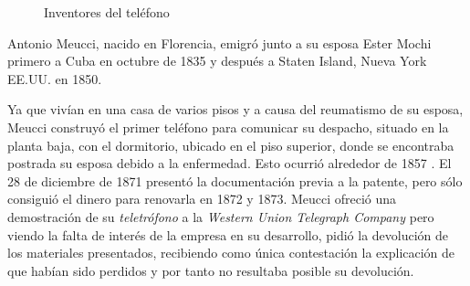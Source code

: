 \begin{figure}[h!btp]
	\begin{adjustbox}{minipage=\linewidth, fbox}
		\centering
		\hspace{10mm}
	\end{adjustbox}
\caption{Inventores del teléfono}
	\label{fig:telefono}
\end{figure}

Antonio Meucci, nacido en Florencia, emigró junto a su esposa Ester Mochi primero a Cuba en octubre de 1835 y después a Staten Island, Nueva York \ac{EE.UU.} en 1850.

Ya que vivían en una casa de varios pisos y a causa del reumatismo de su esposa, Meucci construyó el primer teléfono para comunicar su despacho, situado en la planta baja, con el dormitorio, ubicado en el piso superior, donde se encontraba postrada su esposa debido a la enfermedad. Esto ocurrió alrededor de 1857 \cite{Meuc10}. El 28 de diciembre de 1871 presentó la documentación previa a la patente, pero sólo consiguió el dinero para renovarla en 1872 y 1873. Meucci ofreció una demostración de su \textit{teletrófono} a la \textit{Western Union Telegraph Company} pero viendo la falta de interés de la empresa en su desarrollo, pidió la devolución de los materiales presentados, recibiendo como única contestación la explicación de que habían sido perdidos y por tanto no resultaba  posible su devolución.

